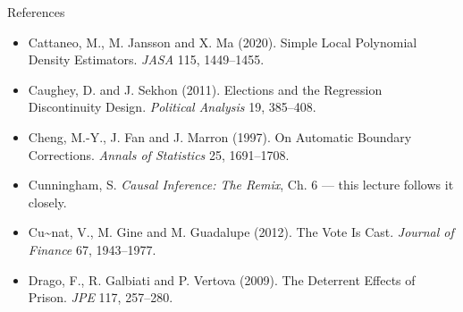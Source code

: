 \documentclass[
  11pt,
  ignorenonframetext,
  aspectratio=169,
]{beamer}
\begin{document}
\begin{frame}{References}
\begin{itemize}
  Cattaneo, M., N. Idrobo and R. Titiunik (2020). \emph{A Practical
  Introduction to Regression Discontinuity Designs}. Cambridge
  University Press.
\item
  Cattaneo, M., M. Jansson and X. Ma (2020). Simple Local Polynomial
  Density Estimators. \emph{JASA} 115, 1449--1455.
\item
  Caughey, D. and J. Sekhon (2011). Elections and the Regression
  Discontinuity Design. \emph{Political Analysis} 19, 385--408.
\item
  Cheng, M.-Y., J. Fan and J. Marron (1997). On Automatic Boundary
  Corrections. \emph{Annals of Statistics} 25, 1691--1708.
\item
  Cunningham, S. \emph{Causal Inference: The Remix}, Ch. 6 --- this
  lecture follows it closely.
\item
  Cu\textasciitilde nat, V., M. Gin\textquotesingle e and M. Guadalupe
  (2012). The Vote Is Cast. \emph{Journal of Finance} 67, 1943--1977.
\item
  Drago, F., R. Galbiati and P. Vertova (2009). The Deterrent Effects of
  Prison. \emph{JPE} 117, 257--280.
\end{itemize}
\end{frame}
\end{document}
